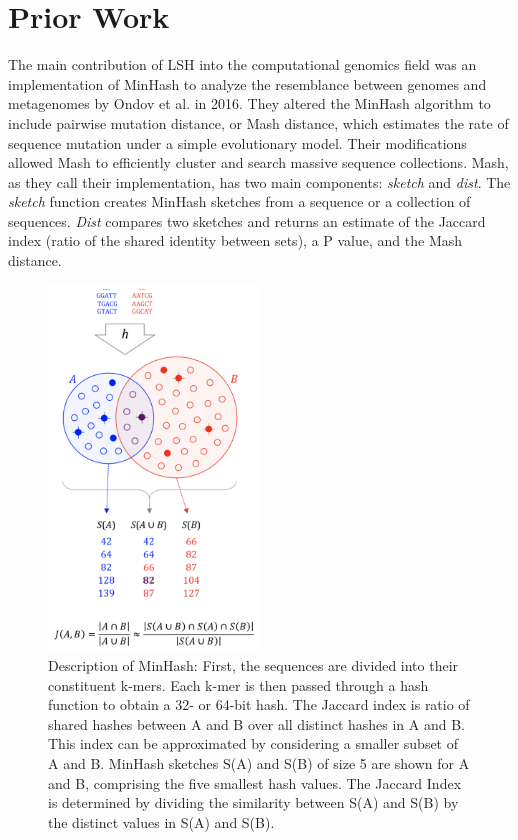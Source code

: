 \documentclass[12pt, letterpaper]{article}
\begin{document}
\section{Prior Work}
The main contribution of LSH into the computational genomics field was an implementation of MinHash to analyze the resemblance between genomes and metagenomes by Ondov et al. in 2016.\cite{MinHash} They altered the MinHash algorithm to include pairwise mutation distance, or Mash distance, which estimates the rate of sequence mutation under a simple evolutionary model. Their modifications allowed Mash to efficiently cluster and search massive sequence collections. Mash, as they call their implementation, has two main components: \textit{sketch} and \textit{dist}. The \textit{sketch} function creates MinHash sketches from a sequence or a collection of sequences. \textit{Dist} compares two sketches and returns an estimate of the Jaccard index (ratio of the shared identity between sets), a P value, and the Mash distance.
\FloatBarrier
\begin{figure}[h!]
	\centering
	\includegraphics[width=0.5\textwidth]{Mash_description.png}
	\caption{Description of MinHash: First, the sequences are divided into their constituent k-mers. Each k-mer is then passed through a hash function to obtain a 32- or 64-bit hash. The Jaccard index is ratio of shared hashes between A and B over all distinct hashes in A and B. This index can be approximated by considering a smaller subset of A and B. MinHash sketches S(A) and S(B) of size 5 are shown for A and B, comprising the five smallest hash values. The Jaccard Index is determined by dividing the similarity between S(A) and S(B) by the distinct values in S(A) and S(B).}
\end{figure}
\end{document}

